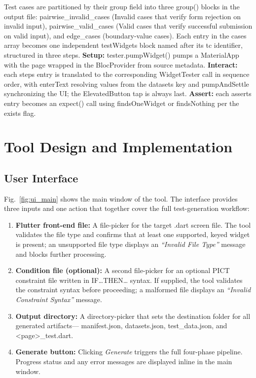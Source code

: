 \documentclass[conference]{IEEEtran}
\renewcommand{\texttt}[1]{\textnormal{#1}}
\begin{document}
Test cases are partitioned by their \texttt{group} field into three
\texttt{group()} blocks in the output file:
\texttt{pairwise\_\allowbreak{}invalid\_\allowbreak{}cases} (Invalid cases that verify form
rejection on invalid input), \texttt{pairwise\_\allowbreak{}valid\_\allowbreak{}cases} (Valid cases
that verify successful submission on valid input), and
\texttt{edge\_cases} (boundary-value cases). Each entry in the
\texttt{cases} array becomes one independent \texttt{testWidgets}
block named after its \texttt{tc} identifier, structured in three
steps. \textbf{Setup:} \texttt{tester.pumpWidget()} pumps a
\texttt{MaterialApp} with the page wrapped in the \texttt{BlocProvider}
from \texttt{source} metadata. \textbf{Interact:} each \texttt{steps}
entry is translated to the corresponding \texttt{WidgetTester} call in
sequence order, with \texttt{enterText} resolving values from the
\texttt{datasets} key and \texttt{pumpAndSettle} synchronizing the UI;
the \texttt{ElevatedButton} tap is always last. \textbf{Assert:} each
\texttt{asserts} entry becomes an \texttt{expect()} call using
\texttt{findsOneWidget} or \texttt{findsNothing} per the \texttt{exists}
flag.

\section{Tool Design and Implementation}

\subsection{User Interface}
Fig.~\ref{fig:ui_main} shows the main window of the tool. The interface
provides three inputs and one action that together cover the full
test-generation workflow:
\begin{enumerate}
  \item \textbf{Flutter front-end file:} A file-picker for the target
        \texttt{.dart} screen file. The tool validates the file type and
        confirms that at least one supported, keyed widget is present;
        an unsupported file type displays an \textit{``Invalid File
        Type''} message and blocks further processing.
  \item \textbf{Condition file (optional):} A second file-picker for an
        optional PICT constraint file written in
        \texttt{IF\ldots THEN\ldots} syntax. If supplied, the tool
        validates the constraint syntax before proceeding; a malformed
        file displays an \textit{``Invalid Constraint Syntax''} message.
  \item \textbf{Output directory:} A directory-picker that sets the
        destination folder for all generated artifacts---
        \texttt{manifest.json}, \texttt{datasets.json},
        \texttt{test\_\allowbreak{}data.json}, and \texttt{<page>\_\allowbreak{}test.dart}.
  \item \textbf{Generate button:} Clicking \textit{Generate} triggers
        the full four-phase pipeline. Progress status and any error
        messages are displayed inline in the main window.
\end{enumerate}
\end{document}
